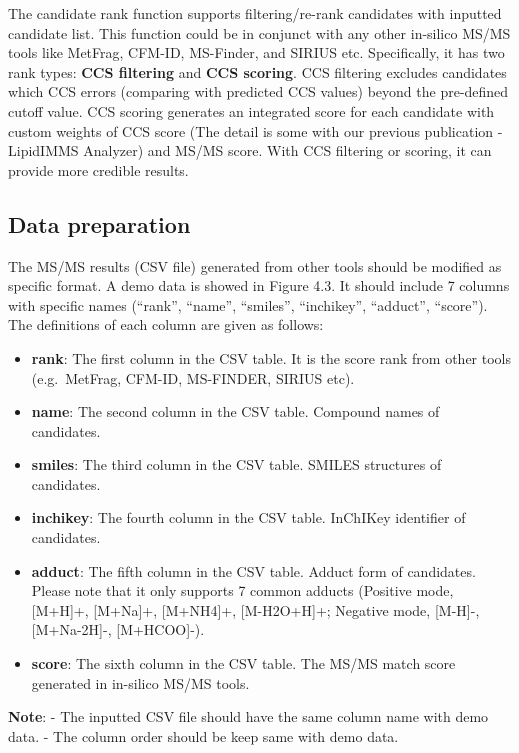 \documentclass[12pt,]{book}
\providecommand{\tightlist}{%
  \setlength{\itemsep}{0pt}\setlength{\parskip}{0pt}}
\theoremstyle{definition}
\theoremstyle{definition}
\theoremstyle{definition}
\theoremstyle{remark}
\begin{document}
The candidate rank function supports filtering/re-rank candidates with
inputted candidate list. This function could be in conjunct with any
other in-silico MS/MS tools like MetFrag, CFM-ID, MS-Finder, and SIRIUS
etc. Specifically, it has two rank types: \textbf{CCS filtering} and
\textbf{CCS scoring}. CCS filtering excludes candidates which CCS errors
(comparing with predicted CCS values) beyond the pre-defined cutoff
value. CCS scoring generates an integrated score for each candidate with
custom weights of CCS score (The detail is some with our previous
publication - LipidIMMS Analyzer) and MS/MS score. With CCS filtering or
scoring, it can provide more credible results.

\subsection{Data preparation}\label{data-preparation-1}

The MS/MS results (CSV file) generated from other tools should be
modified as specific format. A demo data is showed in Figure 4.3. It
should include 7 columns with specific names (``rank'', ``name'',
``smiles'', ``inchikey'', ``adduct'', ``score''). The definitions of
each column are given as follows:

\begin{itemize}
\tightlist
\item
  \textbf{rank}: The first column in the CSV table. It is the score rank
  from other tools (e.g.~MetFrag, CFM-ID, MS-FINDER, SIRIUS etc).
\item
  \textbf{name}: The second column in the CSV table. Compound names of
  candidates.
\item
  \textbf{smiles}: The third column in the CSV table. SMILES structures
  of candidates.
\item
  \textbf{inchikey}: The fourth column in the CSV table. InChIKey
  identifier of candidates.
\item
  \textbf{adduct}: The fifth column in the CSV table. Adduct form of
  candidates. Please note that it only supports 7 common adducts
  (Positive mode, {[}M+H{]}+, {[}M+Na{]}+, {[}M+NH4{]}+, {[}M-H2O+H{]}+;
  Negative mode, {[}M-H{]}-, {[}M+Na-2H{]}-, {[}M+HCOO{]}-).
\item
  \textbf{score}: The sixth column in the CSV table. The MS/MS match
  score generated in in-silico MS/MS tools.
\end{itemize}

\textbf{Note}: - The inputted CSV file should have the same column name
with demo data. - The column order should be keep same with demo data.
\end{document}
